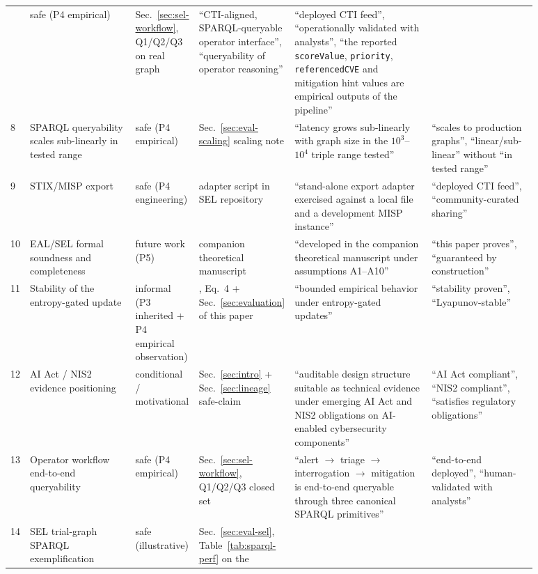 \documentclass[futureinternet,article,submit,pdftex,moreauthors]{Definitions/mdpi}
\begin{document}
\begin{table}[t]
\begin{tabular}{@{}p{0.015\linewidth}p{0.20\linewidth}p{0.08\linewidth}p{0.13\linewidth}p{0.26\linewidth}p{0.20\linewidth}@{}}
  & safe (P4 empirical)
  & Sec.~\ref{sec:sel-workflow}, Q1/Q2/Q3 on real graph
  & ``CTI-aligned, SPARQL-queryable operator interface'',
    ``queryability of operator reasoning''
  & ``deployed CTI feed'', ``operationally validated with analysts'',
    ``the reported \texttt{scoreValue}, \texttt{priority},
    \texttt{referencedCVE} and mitigation hint values are empirical
    outputs of the pipeline'' \\
8 & SPARQL queryability scales sub-linearly in tested range
  & safe (P4 empirical) & Sec.~\ref{sec:eval-scaling} scaling note
  & ``latency grows sub-linearly with graph size in the
    $10^{3}$--$10^{4}$ triple range tested''
  & ``scales to production graphs'',
    ``linear/sub-linear'' without ``in tested range'' \\
9 & STIX/MISP export
  & safe (P4 engineering) & adapter script in SEL repository
  & ``stand-alone export adapter exercised against a local file and a
    development MISP instance''
  & ``deployed CTI feed'', ``community-curated sharing'' \\
10 & EAL/SEL formal soundness and completeness
  & future work (P5) & companion theoretical manuscript~\cite{paper5}
  & ``developed in the companion theoretical manuscript under
    assumptions A1--A10''
  & ``this paper proves'', ``guaranteed by construction'' \\
11 & Stability of the entropy-gated update
  & informal (P3 inherited + P4 empirical observation)
  & \cite{paper3}, Eq.~4 + Sec.~\ref{sec:evaluation} of this paper
  & ``bounded empirical behavior under entropy-gated updates''
  & ``stability proven'', ``Lyapunov-stable'' \\
12 & AI Act / NIS2 evidence positioning
  & conditional / motivational
  & Sec.~\ref{sec:intro} + Sec.~\ref{sec:lineage} safe-claim
  & ``auditable design structure suitable as technical evidence under
    emerging AI Act and NIS2 obligations on AI-enabled cybersecurity
    components''
  & ``AI Act compliant'', ``NIS2 compliant'',
    ``satisfies regulatory obligations'' \\
13 & Operator workflow end-to-end queryability
  & safe (P4 empirical)
  & Sec.~\ref{sec:sel-workflow}, Q1/Q2/Q3 closed set
  & ``alert $\to$ triage $\to$ interrogation $\to$ mitigation is
    end-to-end queryable through three canonical SPARQL primitives''
  & ``end-to-end deployed'', ``human-validated with analysts'' \\
14 & SEL trial-graph SPARQL exemplification
  & safe (illustrative)
  & Sec.~\ref{sec:eval-sel}, Table~\ref{tab:sparql-perf} on the

\end{tabular}
\end{table}
\end{document}
